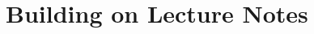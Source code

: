 \documentclass[a4paper,12pt]{report}
\begin{document}



\part{Building on Lecture Notes}












\printbibliography
\end{document}
